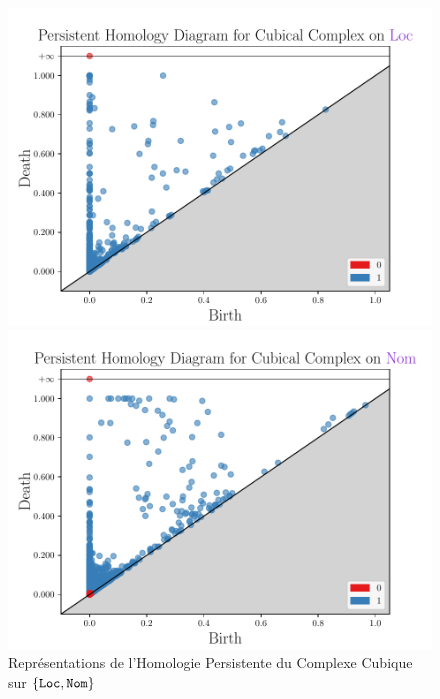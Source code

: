 \documentclass{cours}
\begin{document}
    \begin{figure}[H]
        \begin{minipage}{.5\textwidth}
            \begin{center}
                \includegraphics[width=\linewidth]{Figures/Visualisations/cc_Loc}
            \end{center}
        \end{minipage}
        \begin{minipage}{.5\textwidth}
            \begin{center}
                \includegraphics[width=\linewidth]{Figures/Visualisations/cc_Nom}
            \end{center}
        \end{minipage}
        \caption{Représentations de l'Homologie Persistente du Complexe Cubique sur $\{\tt Loc,Nom\}$}
    \end{figure}
\end{document}
